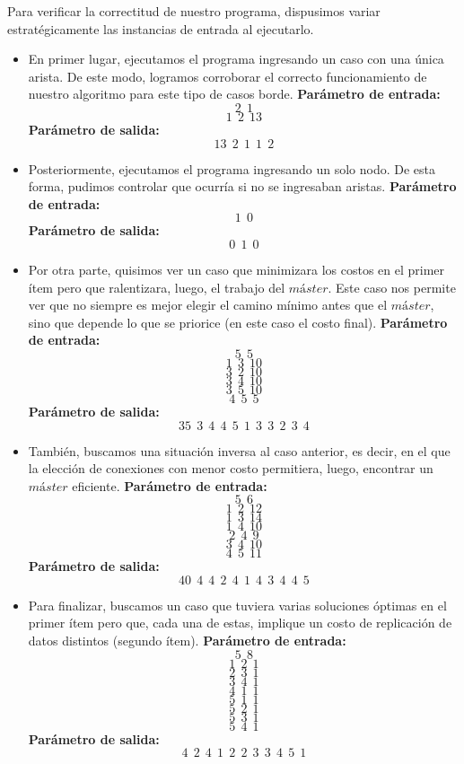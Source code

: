 Para verificar la correctitud de nuestro programa, dispusimos variar estratégicamente las instancias de entrada al ejecutarlo.
\begin{itemize}
\item En primer lugar, ejecutamos el programa ingresando un caso con una única arista. De este modo, logramos corroborar el correcto funcionamiento de nuestro algoritmo para este tipo de casos borde.\newline
\textbf{Parámetro de entrada:} $$2\ \ 1 $$
$$1\ \ 2\ \ 13 $$
\textbf{Parámetro de salida:} $$13\ \ 2\ \ 1\ \ 1\ \ 2$$

\item Posteriormente, ejecutamos el programa ingresando un solo nodo. De esta forma, pudimos controlar que ocurría si no se ingresaban aristas.\newline
\textbf{Parámetro de entrada:} $$1\ \ 0 $$
\textbf{Parámetro de salida:} $$0\ \ 1\ \ 0$$

\item Por otra parte, quisimos ver un caso que minimizara los costos en el primer ítem pero que ralentizara, luego, el trabajo del $máster$. Este caso nos permite ver que no siempre es mejor elegir el camino mínimo antes que el $máster$, sino que depende lo que se priorice (en este caso el costo final).\newline
\textbf{Parámetro de entrada:} $$5\ \ 5$$
$$1\ \ 3\ \ 10$$
$$3\ \ 2\ \ 10$$
$$3\ \  4\ \  10$$
$$3\ \  5\ \  10$$
$$4\ \  5\ \  5$$
\textbf{Parámetro de salida:} $$35\ \ 3\ \ 4\ \ 4\ \ 5\ \ 1\ \ 3\ \ 3\ \ 2\ \ 3\ \ 4 $$

\item También, buscamos una situación inversa al caso anterior, es decir, en el que la elección de conexiones con menor costo permitiera, luego, encontrar un $máster$ eficiente.\newline
\textbf{Parámetro de entrada:} $$5\ \  6$$
$$1\ \  2\ \  12$$
$$1\ \  3\ \ 14$$
$$1\ \  4\ \  10$$
$$2\ \  4\ \ 9$$
$$3\ \  4\ \  10$$
$$4\ \  5\ \ 11$$
\textbf{Parámetro de salida:} $$40\ \ 4\ \ 4\ \ 2\ \ 4\ \ 1\ \ 4\ \ 3\ \ 4\ \ 4\ \ 5$$

\item Para finalizar, buscamos un caso que tuviera varias soluciones óptimas en el primer ítem pero que, cada una de estas, implique un costo de replicación de datos distintos (segundo ítem).\newline
\textbf{Parámetro de entrada:} $$5\ \ 8$$
$$1\ \ 2\ \ 1$$
$$2\ \ 3\ \ 1$$
$$3\ \ 4\ \ 1$$
$$4\ \ 1\ \ 1$$
$$5\ \ 1\ \ 1$$
$$5\ \ 2\ \ 1$$
$$5\ \ 3\ \ 1$$
$$5\ \ 4\ \ 1$$
\textbf{Parámetro de salida:} $$4\ \ 2\ \ 4\ \ 1\ \ 2\ \ 2\ \ 3\ \ 3\ \ 4\ \ 5\ \ 1$$

\end{itemize}

